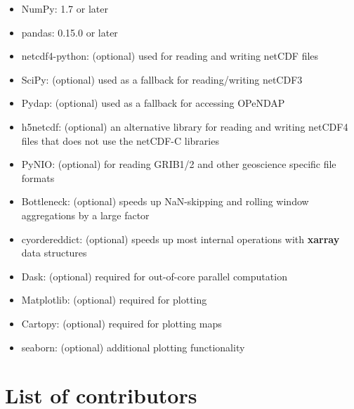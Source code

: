 \documentclass{jors}
\begin{document}
\begin{itemize}
\item NumPy: 1.7 or later
\item pandas: 0.15.0 or later
\item netcdf4-python: (optional) used for reading and writing netCDF files
\item SciPy: (optional) used as a fallback for reading/writing netCDF3
\item Pydap: (optional) used as a fallback for accessing OPeNDAP
\item h5netcdf: (optional) an alternative library for reading and writing netCDF4 files that does not use the netCDF-C libraries
\item PyNIO: (optional) for reading GRIB1/2 and other geoscience specific file formats
\item Bottleneck: (optional) speeds up NaN-skipping and rolling window aggregations by a large factor
\item cyordereddict: (optional) speeds up most internal operations with \textbf{xarray} data structures
\item Dask: (optional) required for out-of-core parallel computation
\item Matplotlib: (optional) required for plotting
\item Cartopy: (optional) required for plotting maps
\item seaborn: (optional) additional plotting functionality
\end{itemize}

\section*{List of contributors}
\end{document}
